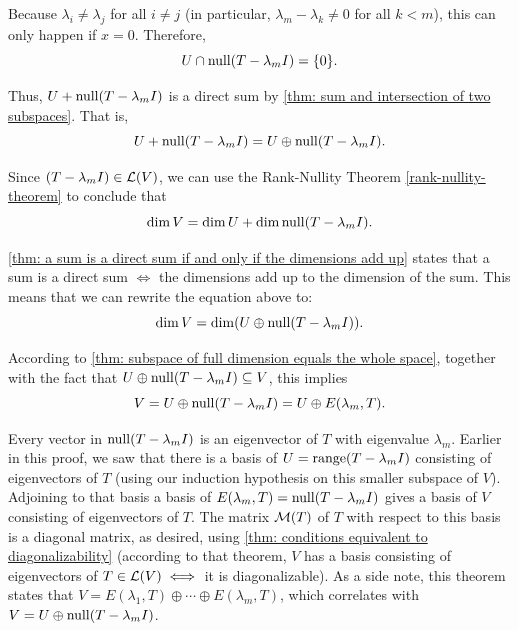 \begin{prf}
  Because $\lambda_i \neq \lambda_j$ for all $i \neq j$ (in particular, $\lambda_m - \lambda_k \neq 0$ for all $k < m$), this can only happen if $x=0$. Therefore,
  \begin{equation}
    U \cap \operatorname{null} (T-\lambda_m I) = \{0\}.
  \end{equation}

  Thus, $U + \operatorname{null} (T-\lambda_m I)$ is a direct sum by \ref{thm: sum and intersection of two subspaces}. That is,
  \begin{equation}
    U + \operatorname{null} (T-\lambda_m I) = U \oplus \operatorname{null} (T-\lambda_m I).
  \end{equation}

  Since $(T-\lambda_m I) \in \mathcal{L} (V)$, we can use the Rank-Nullity Theorem \ref{rank-nullity-theorem} to conclude that
  \begin{equation}
    \dim V = \dim U + \dim \operatorname{null} (T-\lambda_m I).
  \end{equation}

  \ref{thm: a sum is a direct sum if and only if the dimensions add up} states that a sum is a direct sum $\iff$ the dimensions add up to the dimension of the sum. This means that we can rewrite the equation above to:
  \begin{equation}
    \dim V = \dim (U \oplus \operatorname{null} (T-\lambda_m I)).
  \end{equation}

  According to \ref{thm: subspace of full dimension equals the whole space}, together with the fact that $U \oplus \operatorname{null} (T-\lambda_m I) \subseteq V$, this implies
  \begin{equation}
    V=U \oplus \operatorname{null} (T-\lambda_m I) = U \oplus E(\lambda_m, T).
  \end{equation}

  Every vector in $\operatorname{null} (T-\lambda_m I)$ is an eigenvector of $T$ with eigenvalue $\lambda_m$. Earlier in this proof, we saw that there is a basis of $U=\operatorname{range}(T-\lambda_mI)$ consisting of eigenvectors of $T$ (using our induction hypothesis on this smaller subspace of $V$). Adjoining to that basis a basis of $E(\lambda_m, T) = \operatorname{null}(T-\lambda_mI)$ gives a basis of $V$ consisting of eigenvectors of $T$. The matrix $\mathcal{M}(T)$ of $T$ with respect to this basis is a diagonal matrix, as desired, using \ref{thm: conditions equivalent to diagonalizability} (according to that theorem, $V$ has a basis consisting of eigenvectors of $T \in \mathcal{L}(V) \iff$ it is diagonalizable). As a side note, this theorem states that $V = E(\lambda_1, T) \oplus \cdots \oplus E(\lambda_m, T)$, which correlates with $V=U\oplus \operatorname{null} (T-\lambda_m I)$.
\end{prf}

